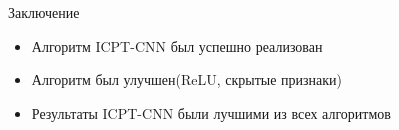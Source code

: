 \documentclass{beamer}
\begin{document}
  \begin{frame}{Заключение}
    \begin{itemize}
      \item{Алгоритм ICPT-CNN был успешно реализован}
      \pause
      \item{Алгоритм был улучшен(ReLU, скрытые признаки)}
      \pause
      \item{Результаты ICPT-CNN были лучшими из всех алгоритмов}
    \end{itemize}
  \end{frame}
\end{document}
